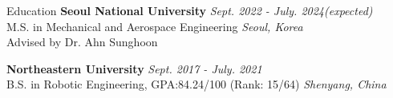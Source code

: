 \begin{rSection}{Education}
{\bf Seoul National University} \hfill {\em Sept. 2022 - July. 2024(expected)} \\
{M.S. in Mechanical and Aerospace Engineering} \hfill {\em Seoul, Korea}\\
Advised by Dr. Ahn Sunghoon

{\bf Northeastern University} \hfill {\em Sept. 2017 - July. 2021} \\
{B.S. in Robotic Engineering}, {GPA:84.24/100 (Rank: 15/64)} \hfill {\em Shenyang, China}\\

\end{rSection}


